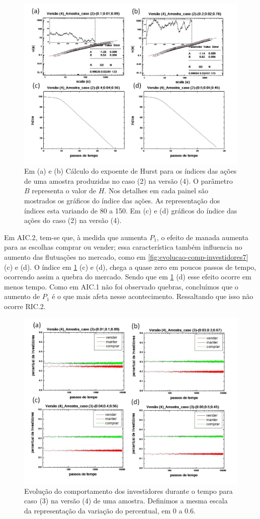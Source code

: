\documentclass[brazil,ruledheader]{abnt}
\begin{document}
\begin{figure}[!h]
\centering
\includegraphics[width=.7\linewidth]{Figuras/29.jpg}
\caption{Em (a) e (b) Cálculo do expoente de Hurst para os índices das ações de
uma amostra produzidas no caso (2) na  versão (4).  O parâmetro $B$ representa o
valor de $H$. Nos detalhes em cada painel são mostrados os gráficos do índice
das ações. As representação dos índices esta variando de 80 a 150.  Em (c) e (d)
gráficos do índice das ações do caso (2) na versão (4). }
\label{fig:calculo-exp-hurst10}
\end{figure}

Em AIC.2, tem-se que, à medida que aumenta $P_1$, o efeito de
manada aumenta para as escolhas comprar ou vender; essa característica também
influencia no aumento das flutuações no mercado, como em
\ref{fig:evolucao-comp-investidores7} (c) e (d). O índice em
\ref{fig:calculo-exp-hurst10} (c) e (d), chega a quase zero em poucos passos de
tempo, ocorrendo assim a quebra do mercado. Sendo que em
\ref{fig:calculo-exp-hurst10} (d) esse efeito ocorre em menos tempo.
Como em AIC.1 não foi observado quebras, concluímos que o aumento de $P_1$
é o que mais afeta nesse acontecimento. Ressaltando que isso não ocorre RIC.2.

\begin{figure}[!h]
\centering
\includegraphics[width=.7\linewidth]{Figuras/30.jpg}
\caption{Evolução do comportamento dos investidores durante o tempo para caso
(3) na  versão (4) de uma amostra. Definimos a mesma escala da representação da
variação do percentual, em 0 a 0.6.  }
\label{fig:evolucao-comp-investidores8}
\end{figure}
\end{document}
